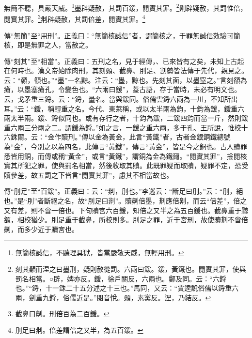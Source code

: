 無簡不聽，具嚴天威。\footnote{無簡核誠信，不聽理具獄，皆當嚴敬天威，無輕用刑。}墨辟疑赦，其罰百鍰，閱實其罪。\footnote{刻其顙而涅之曰墨刑，疑則赦從罰。六兩曰鍰。鍰，黃鐵也。閱實其罪，使與罰名相當。○辟，婢亦反。鍰，徐戶關反，六兩也。鄭及同。云：“六鋝也。”“鋝，十一銖二十五分述之十三也。”馬同，又云：“賈逵說俗儒以鋝重六兩，劍重九鋝，俗儒近是。”閱音悅。顙，素黨反。涅，乃結反。}劓辟疑赦，其罰惟倍，閱實其罪。\footnote{截鼻曰劓。刑倍百為二百鍰。}剕辟疑赦，其罰倍差，閱實其罪。\footnote{刖足曰剕。倍差謂倍之又半，為五百鍰。}


{\noindent\zhuan{}\fzbyks 傳“無簡”至“用刑”。正義曰：“無簡核誠信”者，謂簡核之，于罪無誠信效驗可簡核，即是無罪之人，當赦之。 \par}

{\noindent\zhuan{}\fzbyks 傳“刻其”至“相當”。正義曰：五刑之名，見于經傳，、已來皆有之矣，未知上古起在何時也。漢文帝始除肉刑，其刻顙、截鼻、刖足、割勢皆法傳于先代，親見之。云：“顙，頟也。”“墨”一名黥。注云：“墨，黥也。先刻其面，以墨窒之。”言刻頟為瘡，以墨塞瘡孔，令變色也。“六兩曰鍰”，蓋古語，存于當時，未必有明文也。云，戈矛重三鋝。云：“鋝，量名。當與鍰同。俗儒雲鋝六兩為一川，不知所出耳。”云：“鍰，稱輕重之名。今代、東萊稱，或以太半兩為鈞，十鈞為鍰，鍰重六兩太半兩。鍰、鋝似同也。或有存行之者，十鈞為鍰，二鍰四鈞而當一斤，然則鍰重六兩三分兩之二。謂鍰為鋝。”如之言，一鍰之重六兩，多于孔、王所說，惟校十六銖爾。云：“金作贖刑。”傳以金為黃金，此言“黃鐵”者，古者金銀銅鐵總號為“金”，今別之以為四名，此傳言“黃鐵”，傳言“黃金”，皆是今之銅也。古人贖罪悉皆用銅，而傳或稱“黃金”，或言“黃鐵”，謂銅為金為鐵爾。“閱實其罪”，撿閱核實其所犯之罪，使與罰名相當，然後收取其贖。此既罪疑而取贖，疑罪不定，恐受贖參差，故五罰之下皆言“閱實其罪”，慮其不相當故也。 \par}

{\noindent\zhuan{}\fzbyks 傳“刖足”至“百鍰”。正義曰：云：“剕，刖也。”李巡云：“斷足曰刖。”云：“刖，絕也。”是“刖”者斷絕之名，故“刖足曰剕”。贖劓倍墨，剕應倍劓，而云“倍差”，倍之又有差，則不啻一倍也。下句贖宮六百鍰，知倍之又半之為五百鍰也。截鼻重于黥頟，相校猶少。刖足重于截鼻，所校則多。刖足之罪，近于宮刑，故使贖剕不啻倍劓，而多少近于贖宮也。 \par}

